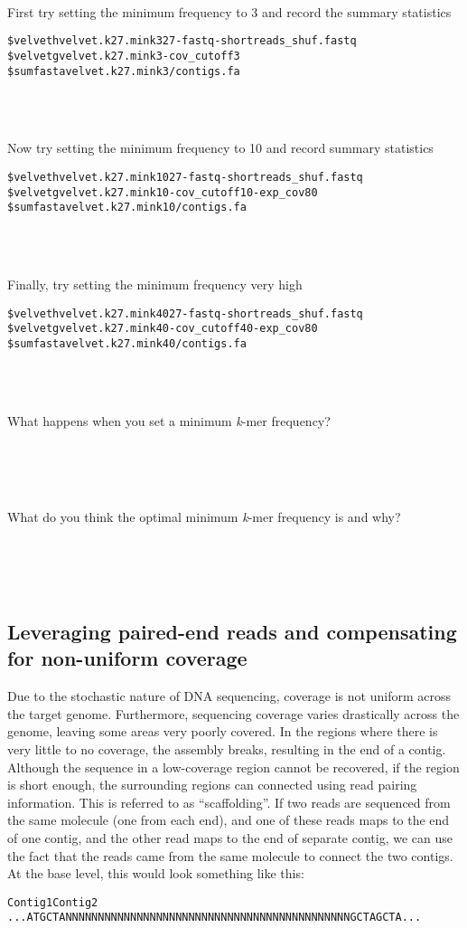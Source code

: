 \documentclass[11pt,a4paper]{scrartcl}
\newcommand{\twolines}{
~\\
~\\
~\\
\noindent
}
\newcommand{\oneline}{
~\\
~\\
\noindent
}
\begin{document}
~\\
\noindent
First try setting the minimum frequency to 3 and record the summary statistics
\begin{alltt}
    \$ velveth velvet.k27.mink3 27 -fastq -short reads_shuf.fastq
    \$ velvetg velvet.k27.mink3 -cov_cutoff 3
    \$ sumfasta velvet.k27.mink3/contigs.fa
\end{alltt}
\oneline
Now try setting the minimum frequency to 10 and record summary statistics
\begin{alltt}
    \$ velveth velvet.k27.mink10 27 -fastq -short reads_shuf.fastq
    \$ velvetg velvet.k27.mink10 -cov_cutoff 10 -exp_cov 80
    \$ sumfasta velvet.k27.mink10/contigs.fa
\end{alltt}
\oneline
Finally, try setting the minimum frequency very high
\begin{alltt}
    \$ velveth velvet.k27.mink40 27 -fastq -short reads_shuf.fastq
    \$ velvetg velvet.k27.mink40 -cov_cutoff 40 -exp_cov 80
    \$ sumfasta velvet.k27.mink40/contigs.fa
\end{alltt}
\oneline
What happens when you set a minimum \emph{k}-mer frequency?
\twolines
What do you think the optimal minimum \emph{k}-mer frequency is and why?
\twolines

\subsection{Leveraging paired-end reads and compensating for non-uniform coverage}

Due to the stochastic nature of DNA sequencing, coverage is not uniform across
the target genome. Furthermore, sequencing coverage varies drastically across
the genome, leaving some areas very poorly covered. In the regions where there
is very little to no coverage, the assembly breaks, resulting in the end of a
contig. Although the sequence in a low-coverage region cannot be recovered, if
the region is short enough, the surrounding regions can connected using read
pairing information. This is referred to as “scaffolding”. If two reads are
sequenced from the same molecule (one from each end), and one of these reads
maps to the end of one contig, and the other read maps to the end of separate
contig, we can use the fact that the reads came from the same molecule to
connect the two contigs. At the base level, this would look something like
this:

\begin{alltt}
        Contig 1                                              Contig 2 
        ...ATGCTANNNNNNNNNNNNNNNNNNNNNNNNNNNNNNNNNNNNNNNNNNNNGCTAGCTA...
\end{alltt}
\end{document}
